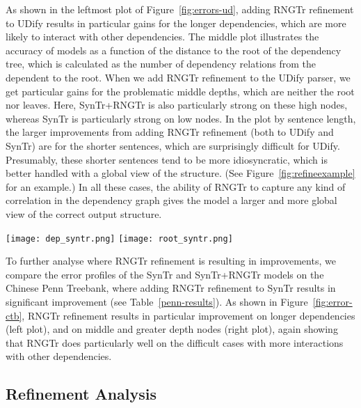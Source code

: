 As shown in the leftmost plot of Figure~\ref{fig:errors-ud}, adding RNGTr refinement to UDify results in particular gains for the longer dependencies, which are more likely to interact with other dependencies.
The middle plot illustrates the accuracy of models as a function of the distance to the root of the dependency tree, which is calculated as the number of dependency relations from the dependent to the root.
When we add RNGTr refinement to the UDify parser, we get particular gains for the problematic middle depths, which are neither the root nor leaves.  Here, SynTr+RNGTr is also particularly strong on these high nodes, whereas SynTr is particularly strong on low nodes.
In the plot by sentence length, the larger improvements from adding RNGTr refinement (both to UDify and SynTr) are for the shorter sentences, which are surprisingly difficult for UDify.  Presumably, these shorter sentences tend to be more idiosyncratic, which is better handled with a global view of the structure. (See Figure~\ref{fig:refineexample} for an example.)
In all these cases, the ability of RNGTr to capture any kind of correlation in the dependency graph gives the model a larger and more global view of the correct output structure.

\begin{figure*}[!ht]
  \centering
  \hspace{-2ex}
  \texttt{[image: dep\_syntr.png]}
  \texttt{[image: root\_syntr.png]}
  \hspace{-2ex}
  \caption{Error analysis of SynTr and SynTr+RNGTr models on Chinese CTB Treebank.
    \vspace{-1ex}
    \label{fig:error-ctb}
  }
\end{figure*}

To further analyse where RNGTr refinement is resulting in improvements,
we compare the error profiles of the  SynTr and SynTr+RNGTr models on the Chinese Penn Treebank, where adding RNGTr refinement to SynTr results in significant improvement (see Table~\ref{penn-results}).
As shown in Figure~\ref{fig:error-ctb}, RNGTr refinement results in particular improvement on longer dependencies (left plot), and on middle and greater depth nodes (right plot), again showing that RNGTr does particularly well on the difficult cases with more interactions with other dependencies.


\subsection{Refinement Analysis}
\label{sec:refine}

